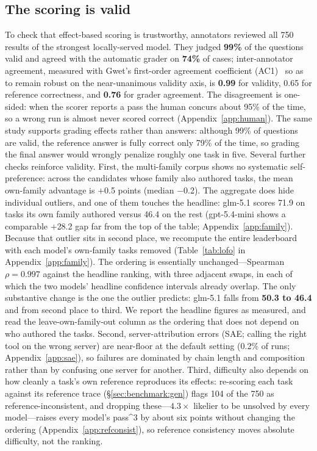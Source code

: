 \subsection{The scoring is valid}
\label{sec:results:validity}
To check that effect-based scoring is trustworthy, annotators reviewed all
750 results of the strongest locally-served model. They judged \textbf{99\%}
of the questions valid and agreed with the automatic grader on \textbf{74\%}
of cases; inter-annotator agreement, measured with Gwet's first-order
agreement coefficient (AC1)~\citep{gwet2008} so as to remain robust on the near-unanimous
validity axis, is \textbf{0.99} for validity, 0.65 for reference
correctness, and \textbf{0.76} for grader agreement. The disagreement is
one-sided: when the scorer reports a pass the human concurs about 95\% of the
time, so a wrong run is almost never scored correct
(Appendix~\ref{app:human}). The same study supports grading effects rather than answers: although 99\% of
questions are valid, the reference answer is fully correct only 79\%
of the time, so grading the final answer would wrongly penalize roughly one
task in five. Several further checks reinforce validity. First, the multi-family
corpus shows no systematic self-preference: across the candidates whose family
also authored tasks, the mean own-family advantage is \(+\)0.5 points (median
\(-\)0.2). The aggregate does hide individual outliers, and one of them
touches the headline: glm-5.1 scores 71.9 on tasks its own family authored
versus 46.4 on the rest (gpt-5.4-mini shows a comparable \(+\)28.2 gap far
from the top of the table; Appendix~\ref{app:family}). Because that outlier
sits in second place, we recompute the entire leaderboard with each model's
own-family tasks removed (Table~\ref{tab:lofo} in
Appendix~\ref{app:family}). The ordering is essentially
unchanged---Spearman \(\rho = 0.997\) against the headline ranking, with three
adjacent swaps, in each of which the two models' headline confidence intervals
already overlap. The only substantive change is the one the outlier predicts:
glm-5.1 falls from \textbf{50.3 to 46.4} and from second place to third. We
report the headline figures as measured, and read the leave-own-family-out
column as the ordering that does not depend on who authored the tasks.
Second, server-attribution errors (SAE;
calling the right tool on the wrong server) are near-floor at the default
setting (0.2\% of runs; Appendix~\ref{app:sae}), so
failures are dominated by chain length and composition rather than by
confusing one server for another. Third, difficulty also depends on how cleanly
a task's own reference reproduces its effects: re-scoring each task against its
reference trace (\S\ref{sec:benchmark:gen}) flags 104 of the 750 as
reference-inconsistent, and dropping these---\(4.3\times\) likelier to be
unsolved by every model---raises every model's pass\textasciicircum{}3 by about
six points without changing the ordering (Appendix~\ref{app:refconsist}), so
reference consistency moves absolute difficulty, not the ranking.

